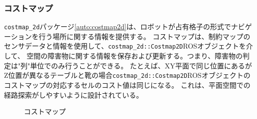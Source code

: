 \subsubsection{コストマップ}
\verb|costmap_2d|パッケージ\ref{auto:costmap2d}は、ロボットが占有格子の形式でナビゲーションを行う場所に関する情報を提供する。
コストマップは、制約マップのセンサデータと情報を使用して、\verb|costmap_2d::Costmap2D|ROSオブジェクトを介して、
空間の障害物に関する情報を保存および更新する。つまり、障害物の判定は"列"単位でのみ行うことができる。
たとえば、XY平面で同じ位置にあるがZ位置が異なるテーブルと靴の場合\verb|costmap_2d::Costmap2D|ROSオブジェクトのコストマップの対応するセルのコスト値は同じになる。
これは、平面空間での経路探索がしやすいように設計されている。

\begin{figure}[h]
  \begin{center}
  \caption{コストマップ}
  \label{auto:costmap_gaiyou}
  \end{center}
\end{figure}

